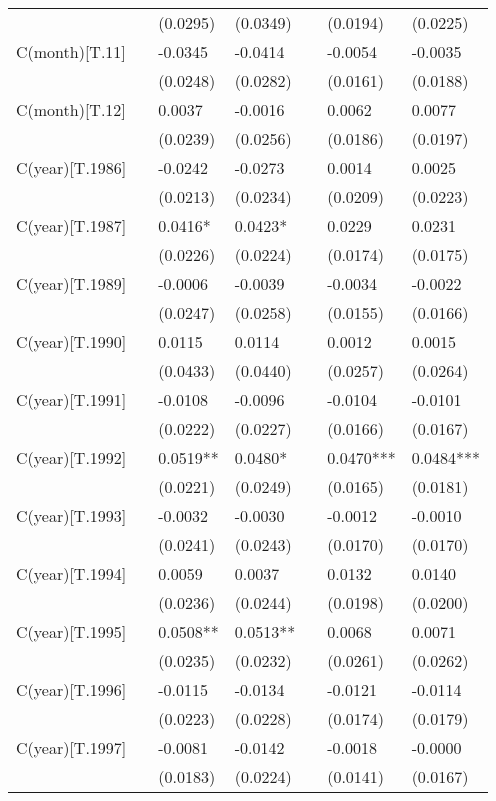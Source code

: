 \begin{tabular}{lllllll}
 &  & (0.0295) & (0.0349) &  & (0.0194) & (0.0225) \\
C(month)[T.11] &  & -0.0345 & -0.0414 &  & -0.0054 & -0.0035 \\
 &  & (0.0248) & (0.0282) &  & (0.0161) & (0.0188) \\
C(month)[T.12] &  & 0.0037 & -0.0016 &  & 0.0062 & 0.0077 \\
 &  & (0.0239) & (0.0256) &  & (0.0186) & (0.0197) \\
C(year)[T.1986] &  & -0.0242 & -0.0273 &  & 0.0014 & 0.0025 \\
 &  & (0.0213) & (0.0234) &  & (0.0209) & (0.0223) \\
C(year)[T.1987] &  & 0.0416* & 0.0423* &  & 0.0229 & 0.0231 \\
 &  & (0.0226) & (0.0224) &  & (0.0174) & (0.0175) \\
C(year)[T.1989] &  & -0.0006 & -0.0039 &  & -0.0034 & -0.0022 \\
 &  & (0.0247) & (0.0258) &  & (0.0155) & (0.0166) \\
C(year)[T.1990] &  & 0.0115 & 0.0114 &  & 0.0012 & 0.0015 \\
 &  & (0.0433) & (0.0440) &  & (0.0257) & (0.0264) \\
C(year)[T.1991] &  & -0.0108 & -0.0096 &  & -0.0104 & -0.0101 \\
 &  & (0.0222) & (0.0227) &  & (0.0166) & (0.0167) \\
C(year)[T.1992] &  & 0.0519** & 0.0480* &  & 0.0470*** & 0.0484*** \\
 &  & (0.0221) & (0.0249) &  & (0.0165) & (0.0181) \\
C(year)[T.1993] &  & -0.0032 & -0.0030 &  & -0.0012 & -0.0010 \\
 &  & (0.0241) & (0.0243) &  & (0.0170) & (0.0170) \\
C(year)[T.1994] &  & 0.0059 & 0.0037 &  & 0.0132 & 0.0140 \\
 &  & (0.0236) & (0.0244) &  & (0.0198) & (0.0200) \\
C(year)[T.1995] &  & 0.0508** & 0.0513** &  & 0.0068 & 0.0071 \\
 &  & (0.0235) & (0.0232) &  & (0.0261) & (0.0262) \\
C(year)[T.1996] &  & -0.0115 & -0.0134 &  & -0.0121 & -0.0114 \\
 &  & (0.0223) & (0.0228) &  & (0.0174) & (0.0179) \\
C(year)[T.1997] &  & -0.0081 & -0.0142 &  & -0.0018 & -0.0000 \\
 &  & (0.0183) & (0.0224) &  & (0.0141) & (0.0167) \\

\end{tabular}
